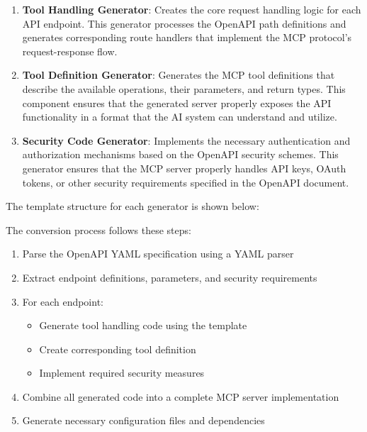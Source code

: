 \documentclass[../Main.tex]{subfiles}
\begin{document}
\begin{enumerate}
    \item \textbf{Tool Handling Generator}: Creates the core request handling logic for each API endpoint. This generator processes the OpenAPI path definitions and generates corresponding route handlers that implement the MCP protocol's request-response flow.
    
    \item \textbf{Tool Definition Generator}: Generates the MCP tool definitions that describe the available operations, their parameters, and return types. This component ensures that the generated server properly exposes the API functionality in a format that the AI system can understand and utilize.
    
    \item \textbf{Security Code Generator}: Implements the necessary authentication and authorization mechanisms based on the OpenAPI security schemes. This generator ensures that the MCP server properly handles API keys, OAuth tokens, or other security requirements specified in the OpenAPI document.
\end{enumerate}

The template structure for each generator is shown below:







The conversion process follows these steps:
\begin{enumerate}
    \item Parse the OpenAPI YAML specification using a YAML parser
    \item Extract endpoint definitions, parameters, and security requirements
    \item For each endpoint:
    \begin{itemize}
        \item Generate tool handling code using the template
        \item Create corresponding tool definition
        \item Implement required security measures
    \end{itemize}
    \item Combine all generated code into a complete MCP server implementation
    \item Generate necessary configuration files and dependencies
\end{enumerate}
\end{document}

